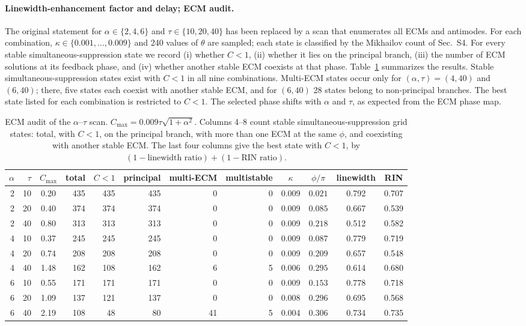 \documentclass[11pt]{article}
\newif\ifmarked
\newenvironment{revised}{\ifmarked\color{blue}\fi}{}
\begin{document}
\begin{revised}\paragraph{Linewidth-enhancement factor and delay; ECM audit.} The original statement for $\alpha\in\{2,4,6\}$ and $\tau\in\{10,20,40\}$ has been replaced by a scan that enumerates all ECMs and antimodes. For each combination, $\kappa\in\{0.001,\dots,0.009\}$ and 240 values of $\theta$ are sampled; each state is classified by the Mikhailov count of Sec.~S4. For every stable simultaneous-suppression state we record (i) whether $C<1$, (ii) whether it lies on the principal branch, (iii) the number of ECM solutions at its feedback phase, and (iv) whether another stable ECM coexists at that phase. Table~\ref{tab:audit} summarizes the results. Stable simultaneous-suppression states exist with $C<1$ in all nine combinations. Multi-ECM states occur only for $(\alpha,\tau)=(4,40)$ and $(6,40)$; there, five states each coexist with another stable ECM, and for $(6,40)$ 28 states belong to non-principal branches. The best state listed for each combination is restricted to $C<1$. The selected phase shifts with $\alpha$ and $\tau$, as expected from the ECM phase map.

\begin{table}[h]
\centering
\small
\caption{ECM audit of the $\alpha$--$\tau$ scan. $C_{\max}=0.009\tau\sqrt{1+\alpha^2}$. Columns 4--8 count stable simultaneous-suppression grid states: total, with $C<1$, on the principal branch, with more than one ECM at the same $\phi$, and coexisting with another stable ECM. The last four columns give the best state with $C<1$, by $(1-\text{linewidth ratio})+(1-\text{RIN ratio})$.}
\label{tab:audit}
\setlength{\tabcolsep}{4pt}
\begin{tabular}{rrcrrrrrcccc}
\toprule
$\alpha$ & $\tau$ & $C_{\max}$ & total & $C<1$ & principal & multi-ECM & multistable & $\kappa$ & $\phi/\pi$ & linewidth & RIN\\
\midrule
2 & 10 & 0.20 & 435 & 435 & 435 & 0 & 0 & 0.009 & $0.021$ & 0.792 & 0.707\\
2 & 20 & 0.40 & 374 & 374 & 374 & 0 & 0 & 0.009 & $0.085$ & 0.667 & 0.539\\
2 & 40 & 0.80 & 313 & 313 & 313 & 0 & 0 & 0.009 & $0.218$ & 0.512 & 0.582\\
4 & 10 & 0.37 & 245 & 245 & 245 & 0 & 0 & 0.009 & $0.087$ & 0.779 & 0.719\\
4 & 20 & 0.74 & 208 & 208 & 208 & 0 & 0 & 0.009 & $0.209$ & 0.657 & 0.548\\
4 & 40 & 1.48 & 162 & 108 & 162 & 6 & 5 & 0.006 & $0.295$ & 0.614 & 0.680\\
6 & 10 & 0.55 & 171 & 171 & 171 & 0 & 0 & 0.009 & $0.153$ & 0.778 & 0.718\\
6 & 20 & 1.09 & 137 & 121 & 137 & 0 & 0 & 0.008 & $0.296$ & 0.695 & 0.568\\
6 & 40 & 2.19 & 108 & 48 & 80 & 41 & 5 & 0.004 & $0.306$ & 0.734 & 0.735\\
\bottomrule
\end{tabular}
\end{table}\end{revised}
\end{document}
